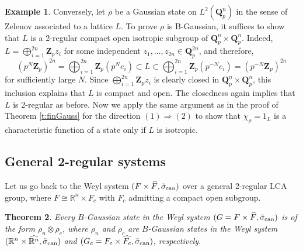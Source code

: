 \documentclass[12pt,reqno]{amsart}
\newtheorem{thm}{Theorem}
\theoremstyle{definition}
\newtheorem{ex}[thm]{Example}
\theoremstyle{definition}
\theoremstyle{definition}
\numberwithin{thm}{section}
\numberwithin{equation}{section}
\newcommand{\Real}{\mathbb R}
\newcommand{\ten}{\otimes}
\newcommand{\bR}{\mathbb{R}}
\begin{document}
\begin{ex}


Conversely, let $\rho$ be a Gaussian state on $L^2(\textbf{Q}_p^n)$ in the sense of Zelenov associated to a lattice $L$. To prove $\rho$ is B-Gaussian, it suffices to show that $L$ is a 2-regular compact open isotropic subgroup of $\textbf{Q}_p^n\times \textbf{Q}_p^n$. Indeed, $L= \bigoplus_{i=1}^{2n} \textbf{Z}_p z_i$ for some independent $z_1,\ldots, z_{2n}\in\textbf{Q}_p^{2n}$, and therefore, 
    $$(p^N\textbf{Z}_p)^{2n}=\bigoplus_{i=1}^{2n}\textbf{Z}_p(p^Ne_i) \subset L\subset \bigoplus_{i=1}^{2n}\textbf{Z}_p(p^{-N}e_i) = (p^{-N}\textbf{Z}_p)^{2n}$$
for sufficiently large $N$. Since $\bigoplus_{i=1}^{2n} \textbf{Z}_p z_i$ is clearly closed in $\textbf{Q}_p^n\times \textbf{Q}_p^n$, this inclusion explains that $L$ is compact and open. The closedness again implies that $L$ is 2-regular as before. Now we apply the same argument as in the proof of Theorem \ref{t:finGauss} for the direction $(1)\Rightarrow(2)$ to show that $\chi_{\rho}=1_{L}$ is a characteristic function of a state only if $L$ is isotropic.

\end{ex}


\subsection{General 2-regular systems}

Let us go back to the Weyl system $(F\times\widehat{F}, \tilde{\sigma}_{\rm can})$ over a general 2-regular LCA group, where $F \cong \Real^n \times F_c$ with $F_c$ admitting a compact open subgroup.

\begin{thm}\label{p:noent} Every $B$-Gaussian state in the Weyl system $(G = F\times\widehat{F}, \tilde{\sigma}_{\rm can})$ is of the form $\rho_n\ten \rho_c$, where $\rho_n$ and $\rho_c$ are $B$-Gaussian states in the Weyl system $(\bR^n\times\widehat{\bR^n}, \tilde{\sigma}_{\rm can})$ and $(G_c = F_c\times \widehat{F_c}, \tilde{\sigma}_{\rm can})$, respectively.
\end{thm}
\end{document}

